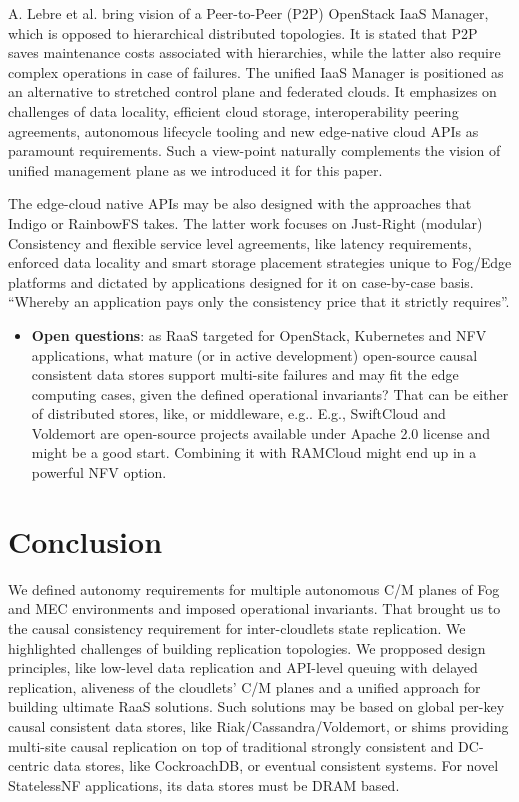 \documentclass[conference]{IEEEtran}
\begin{document}
A. Lebre et al.\cite{b9} bring vision of a Peer-to-Peer (P2P) OpenStack IaaS
Manager, which is opposed to hierarchical distributed topologies. It is stated
that P2P saves maintenance costs associated with hierarchies, while the latter
also require complex operations in case of failures. The unified IaaS Manager
is positioned as an alternative to stretched control plane and federated
clouds. It emphasizes on challenges of data locality, efficient cloud storage,
interoperability peering agreements, autonomous lifecycle tooling and new
edge-native cloud APIs as paramount requirements. Such a view-point naturally
complements the vision of unified management plane as we introduced it for this
paper.

The edge-cloud native APIs may be also designed with the approaches that
Indigo\cite{b10} or RainbowFS\cite{b7} takes. The latter work focuses on
Just-Right (modular) Consistency and flexible service level agreements, like
latency requirements, enforced data locality and smart storage placement
strategies unique to Fog/Edge platforms and dictated by applications designed
for it on case-by-case basis. ``Whereby an application pays only the
consistency price that it strictly requires''\cite{b7}.

\begin{itemize}
  \item \textbf{Open questions}: as RaaS targeted for OpenStack, Kubernetes and
    NFV applications, what mature (or in active development) open-source causal
    consistent data stores support multi-site failures and may fit the edge
    computing cases, given the defined operational invariants? That can be
    either of distributed stores, like\cite{b11}\cite{b12}, or middleware,
    e.g.\cite{b1}\cite{b2}\cite{b7}\cite{b10}\cite{b13}. E.g., SwiftCloud and
    Voldemort are open-source projects available under Apache 2.0 license and
    might be a good start. Combining it with RAMCloud might end up in a
    powerful NFV option.
\end{itemize}

\section{Conclusion}
We defined autonomy requirements for multiple autonomous C/M planes of Fog and
MEC environments and imposed operational invariants. That brought us to
the causal consistency requirement for inter-cloudlets state replication. We
highlighted challenges of building replication topologies. We propposed design principles, like low-level
data replication and API-level queuing with delayed replication, aliveness of
the cloudlets' C/M planes and a unified approach for building ultimate RaaS
solutions. Such solutions may be based on global per-key causal consistent data
stores, like Riak/Cassandra/Voldemort, or shims providing multi-site causal
replication on top of traditional strongly consistent and DC-centric data
stores, like CockroachDB, or eventual consistent systems. For novel StatelessNF
applications, its data stores must be DRAM based.
\end{document}

